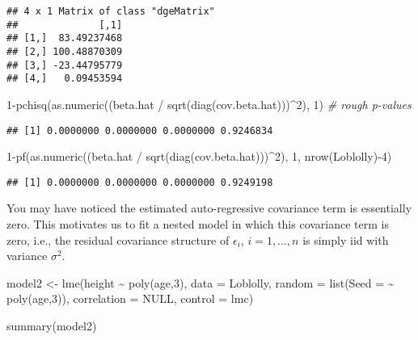 \documentclass[
]{book}
\newenvironment{Shaded}{\begin{snugshade}}{\end{snugshade}}
\newcommand{\AttributeTok}[1]{\textcolor[rgb]{0.77,0.63,0.00}{#1}}
\newcommand{\CommentTok}[1]{\textcolor[rgb]{0.56,0.35,0.01}{\textit{#1}}}
\newcommand{\ConstantTok}[1]{\textcolor[rgb]{0.00,0.00,0.00}{#1}}
\newcommand{\DecValTok}[1]{\textcolor[rgb]{0.00,0.00,0.81}{#1}}
\newcommand{\FunctionTok}[1]{\textcolor[rgb]{0.00,0.00,0.00}{#1}}
\newcommand{\NormalTok}[1]{#1}
\newcommand{\OtherTok}[1]{\textcolor[rgb]{0.56,0.35,0.01}{#1}}
\newcommand{\SpecialCharTok}[1]{\textcolor[rgb]{0.00,0.00,0.00}{#1}}
\begin{document}
\begin{verbatim}
## 4 x 1 Matrix of class "dgeMatrix"
##              [,1]
## [1,]  83.49237468
## [2,] 100.48870309
## [3,] -23.44795779
## [4,]   0.09453594
\end{verbatim}

\begin{Shaded}
\begin{Highlighting}[]
\DecValTok{1}\SpecialCharTok{{-}}\FunctionTok{pchisq}\NormalTok{(}\FunctionTok{as.numeric}\NormalTok{((beta.hat }\SpecialCharTok{/} \FunctionTok{sqrt}\NormalTok{(}\FunctionTok{diag}\NormalTok{(cov.beta.hat)))}\SpecialCharTok{\^{}}\DecValTok{2}\NormalTok{), }\DecValTok{1}\NormalTok{) }\CommentTok{\# rough p{-}values}
\end{Highlighting}
\end{Shaded}

\begin{verbatim}
## [1] 0.0000000 0.0000000 0.0000000 0.9246834
\end{verbatim}

\begin{Shaded}
\begin{Highlighting}[]
\DecValTok{1}\SpecialCharTok{{-}}\FunctionTok{pf}\NormalTok{(}\FunctionTok{as.numeric}\NormalTok{((beta.hat }\SpecialCharTok{/} \FunctionTok{sqrt}\NormalTok{(}\FunctionTok{diag}\NormalTok{(cov.beta.hat)))}\SpecialCharTok{\^{}}\DecValTok{2}\NormalTok{), }\DecValTok{1}\NormalTok{, }\FunctionTok{nrow}\NormalTok{(Loblolly)}\SpecialCharTok{{-}}\DecValTok{4}\NormalTok{)}
\end{Highlighting}
\end{Shaded}

\begin{verbatim}
## [1] 0.0000000 0.0000000 0.0000000 0.9249198
\end{verbatim}

You may have noticed the estimated auto-regressive covariance term is essentially zero. This motivates us to fit a nested model in which this covariance term is zero, i.e., the residual covariance structure of \(\epsilon_i\), \(i=1, \ldots, n\) is simply iid with variance \(\sigma^2\).

\begin{Shaded}
\begin{Highlighting}[]
\NormalTok{model2 }\OtherTok{\textless{}{-}} \FunctionTok{lme}\NormalTok{(height }\SpecialCharTok{\textasciitilde{}} \FunctionTok{poly}\NormalTok{(age,}\DecValTok{3}\NormalTok{), }\AttributeTok{data =}\NormalTok{ Loblolly,}
\AttributeTok{random =} \FunctionTok{list}\NormalTok{(}\AttributeTok{Seed =} \SpecialCharTok{\textasciitilde{}} \FunctionTok{poly}\NormalTok{(age,}\DecValTok{3}\NormalTok{)),}
\AttributeTok{correlation =} \ConstantTok{NULL}\NormalTok{, }\AttributeTok{control =}\NormalTok{ lmc)}

\FunctionTok{summary}\NormalTok{(model2)}
\end{Highlighting}
\end{Shaded}
\end{document}
